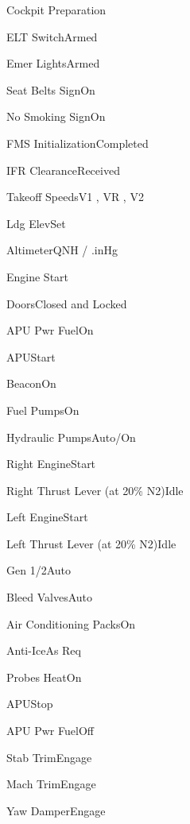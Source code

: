 \documentclass[sim-use, halfpage]{checklist}
\begin{document}
\begin{checklist}{Cockpit Preparation}
{    }
    \item{ELT Switch}{Armed}
    \item{Emer Lights}{Armed}
    \item{Seat Belts Sign}{On}
    \item{No Smoking Sign}{On}
    \item{FMS Initialization}{Completed}
    \item{IFR Clearance}{Received}
    \item{Takeoff Speeds}{V1 \blank, VR \blank, V2 \blank}
    \item{Ldg Elev}{Set}
    \item{Altimeter}{\blank QNH / \blank.\blank inHg}
\end{checklist}

\begin{checklist}{Engine Start}
    \item{Doors}{Closed and Locked}
    \item{APU Pwr Fuel}{On}
    \item{APU}{Start}
    \item{Beacon}{On}
    \item{Fuel Pumps}{On}
    \item{Hydraulic Pumps}{Auto/On}
    \item{Right Engine}{Start}
    \item{Right Thrust Lever (at 20\% N2)}{Idle}
    \item{Left Engine}{Start}
    \item{Left Thrust Lever (at 20\% N2)}{Idle}
    \item{Gen 1/2}{Auto}
    \item{Bleed Valves}{Auto}
    \item{Air Conditioning Packs}{On}
    \item{Anti-Ice}{As Req}
    \item{Probes Heat}{On}
    \item{APU}{Stop}
    \item{APU Pwr Fuel}{Off}
    \item{Stab Trim}{Engage}
    \item{Mach Trim}{Engage}
    \item{Yaw Damper}{Engage}
\end{checklist}
\end{document}

